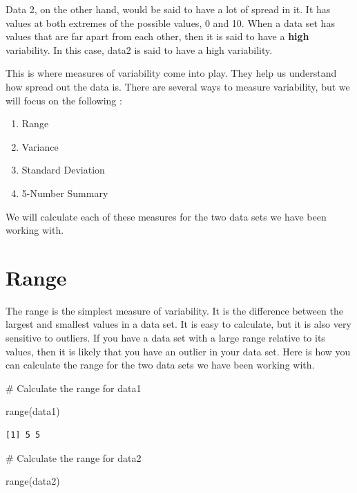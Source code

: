 \documentclass[
  letterpaper,
  DIV=11,
  numbers=noendperiod]{scrreprt}
\newenvironment{Shaded}{\begin{snugshade}}{\end{snugshade}}
\newcommand{\CommentTok}[1]{\textcolor[rgb]{0.37,0.37,0.37}{#1}}
\newcommand{\FunctionTok}[1]{\textcolor[rgb]{0.28,0.35,0.67}{#1}}
\newcommand{\NormalTok}[1]{\textcolor[rgb]{0.00,0.23,0.31}{#1}}
\providecommand{\tightlist}{%
  \setlength{\itemsep}{0pt}\setlength{\parskip}{0pt}}\usepackage{longtable,booktabs,array}
\begin{document}
Data 2, on the other hand, would be said to have a lot of spread in it.
It has values at both extremes of the possible values, 0 and 10. When a
data set has values that are far apart from each other, then it is said
to have a \textbf{high} variability. In this case, data2 is said to have
a high variability.

This is where measures of variability come into play. They help us
understand how spread out the data is. There are several ways to measure
variability, but we will focus on the following :

\begin{enumerate}
\def\labelenumi{\arabic{enumi}.}
\tightlist
\item
  Range
\item
  Variance
\item
  Standard Deviation
\item
  5-Number Summary
\end{enumerate}

We will calculate each of these measures for the two data sets we have
been working with.

\section*{Range}\label{range}


The range is the simplest measure of variability. It is the difference
between the largest and smallest values in a data set. It is easy to
calculate, but it is also very sensitive to outliers. If you have a data
set with a large range relative to its values, then it is likely that
you have an outlier in your data set. Here is how you can calculate the
range for the two data sets we have been working with.

\begin{Shaded}
\begin{Highlighting}[]
\CommentTok{\# Calculate the range for data1}

\FunctionTok{range}\NormalTok{(data1)}
\end{Highlighting}
\end{Shaded}

\begin{verbatim}
[1] 5 5
\end{verbatim}

\begin{Shaded}
\begin{Highlighting}[]
\CommentTok{\# Calculate the range for data2}

\FunctionTok{range}\NormalTok{(data2)}
\end{Highlighting}
\end{Shaded}
\end{document}
